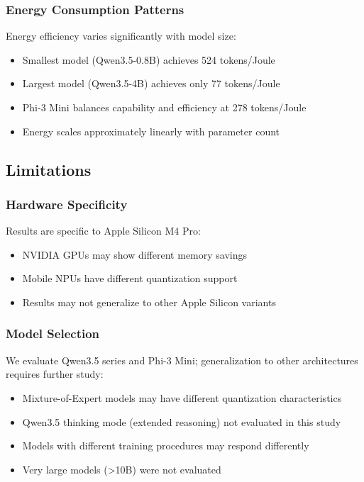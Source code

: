 \documentclass[11pt,a4paper]{article}
\begin{document}
\subsubsection{Energy Consumption Patterns}

Energy efficiency varies significantly with model size:

\begin{itemize}[leftmargin=*,nosep]
    \item Smallest model (Qwen3.5-0.8B) achieves 524 tokens/Joule
    \item Largest model (Qwen3.5-4B) achieves only 77 tokens/Joule
    \item Phi-3 Mini balances capability and efficiency at 278 tokens/Joule
    \item Energy scales approximately linearly with parameter count
\end{itemize}
\subsection{Limitations}



\subsubsection{Hardware Specificity}

Results are specific to Apple Silicon M4 Pro:

\begin{itemize}[leftmargin=*,nosep]
    \item NVIDIA GPUs may show different memory savings
    \item Mobile NPUs have different quantization support
    \item Results may not generalize to other Apple Silicon variants
\end{itemize}

\subsubsection{Model Selection}

We evaluate Qwen3.5 series and Phi-3 Mini; generalization to other architectures requires further study:

\begin{itemize}[leftmargin=*,nosep]
    \item Mixture-of-Expert models may have different quantization characteristics
    \item Qwen3.5 thinking mode (extended reasoning) not evaluated in this study
    \item Models with different training procedures may respond differently
    \item Very large models (>10B) were not evaluated
\end{itemize}
\end{document}
